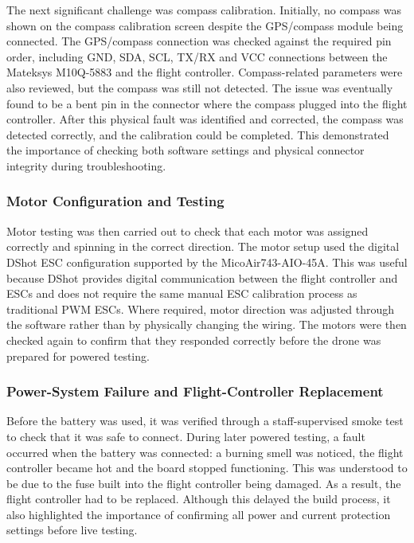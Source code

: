 \documentclass[conference]{IEEEtran}
\begin{document}
The next significant challenge was compass calibration. Initially, no compass was shown on the compass calibration screen despite the GPS/compass module being connected. The GPS/compass connection was checked against the required pin order, including GND, SDA, SCL, TX/RX and VCC connections between the Mateksys M10Q-5883 and the flight controller. Compass-related parameters were also reviewed, but the compass was still not detected. The issue was eventually found to be a bent pin in the connector where the compass plugged into the flight controller. After this physical fault was identified and corrected, the compass was detected correctly, and the calibration could be completed. This demonstrated the importance of checking both software settings and physical connector integrity during troubleshooting.



\subsubsection*{Motor Configuration and Testing}

Motor testing was then carried out to check that each motor was assigned correctly and spinning in the correct direction. The motor setup used the digital DShot ESC configuration supported by the MicoAir743-AIO-45A. This was useful because DShot provides digital communication between the flight controller and ESCs and does not require the same manual ESC calibration process as traditional PWM ESCs. Where required, motor direction was adjusted through the software rather than by physically changing the wiring. The motors were then checked again to confirm that they responded correctly before the drone was prepared for powered testing.



\subsubsection*{Power-System Failure and Flight-Controller Replacement}

Before the battery was used, it was verified through a staff-supervised smoke test to check that it was safe to connect. During later powered testing, a fault occurred when the battery was connected: a burning smell was noticed, the flight controller became hot and the board stopped functioning. This was understood to be due to the fuse built into the flight controller being damaged. As a result, the flight controller had to be replaced. Although this delayed the build process, it also highlighted the importance of confirming all power and current protection settings before live testing.
\end{document}
